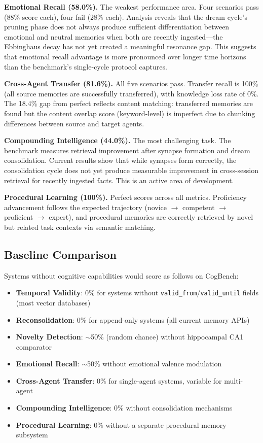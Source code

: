 \documentclass{article}
\begin{document}
\textbf{Emotional Recall (58.0\%).} The weakest performance area. Four scenarios pass (88\% score each), four fail (28\% each). Analysis reveals that the dream cycle's pruning phase does not always produce sufficient differentiation between emotional and neutral memories when both are recently ingested---the Ebbinghaus decay has not yet created a meaningful resonance gap. This suggests that emotional recall advantage is more pronounced over longer time horizons than the benchmark's single-cycle protocol captures.

\textbf{Cross-Agent Transfer (81.6\%).} All five scenarios pass. Transfer recall is 100\% (all source memories are successfully transferred), with knowledge loss rate of 0\%. The 18.4\% gap from perfect reflects content matching: transferred memories are found but the content overlap score (keyword-level) is imperfect due to chunking differences between source and target agents.

\textbf{Compounding Intelligence (44.0\%).} The most challenging task. The benchmark measures retrieval improvement after synapse formation and dream consolidation. Current results show that while synapses form correctly, the consolidation cycle does not yet produce measurable improvement in cross-session retrieval for recently ingested facts. This is an active area of development.

\textbf{Procedural Learning (100\%).} Perfect scores across all metrics. Proficiency advancement follows the expected trajectory (novice $\rightarrow$ competent $\rightarrow$ proficient $\rightarrow$ expert), and procedural memories are correctly retrieved by novel but related task contexts via semantic matching.

\subsection{Baseline Comparison}

Systems without cognitive capabilities would score as follows on CogBench:

\begin{itemize}[nosep]
  \item \textbf{Temporal Validity}: 0\% for systems without \texttt{valid\_from}/\texttt{valid\_until} fields (most vector databases)
  \item \textbf{Reconsolidation}: 0\% for append-only systems (all current memory APIs)
  \item \textbf{Novelty Detection}: $\sim$50\% (random chance) without hippocampal CA1 comparator
  \item \textbf{Emotional Recall}: $\sim$50\% without emotional valence modulation
  \item \textbf{Cross-Agent Transfer}: 0\% for single-agent systems, variable for multi-agent
  \item \textbf{Compounding Intelligence}: 0\% without consolidation mechanisms
  \item \textbf{Procedural Learning}: 0\% without a separate procedural memory subsystem
\end{itemize}
\end{document}
